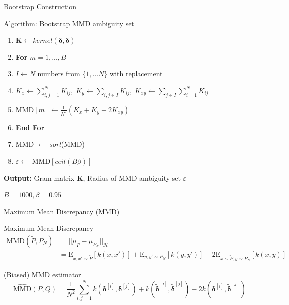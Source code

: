 \documentclass[student, noshadow, itr, english, aspectratio=169]{ITR_LSR_slides}
\begin{document}
\begin{frame}{Bootstrap Construction}
\begin{block}{Algorithm: Bootstrap MMD ambiguity set}
\begin{enumerate}
\item $\boldsymbol{K} \leftarrow \textit{kernel}(\boldsymbol{\delta}, \boldsymbol{\delta})$
\item \textbf{For} $m = 1,...,B$
\item \;\; $I \leftarrow N$ numbers from $\{1, \dots N \}$ with replacement
\item \;\; $K_x \leftarrow \sum_{i,j = 1}^N K_{ij}, \;K_y \leftarrow \sum_{i,j \in I} K_{ij}, \;K_{xy} \leftarrow \sum_{j \in I} \sum_{i = 1}^N K_{ij}$
\item \;\; MMD$[m] \leftarrow \frac{1}{N^2} \left( K_x + K_y - 2 K_{xy} \right) $
\item \textbf{End For} 
\item MMD $ \leftarrow$ \textit{sort}(MMD)
\item $\varepsilon \gets$ MMD$\left[ \textit{ceil} (B \beta) \right]$
\end{enumerate}
\textbf{Output:} Gram matrix $\boldsymbol{K}$, Radius of MMD ambiguity set $\varepsilon$
\end{block}
$B = 1000, \beta = 0.95$
\end{frame}

\begin{frame}{Maximum Mean Discrepancy (MMD)}
\begin{block}{Maximum Mean Discrepancy}
\begin{equation*}
\begin{aligned}
\text{MMD}(\tilde{P}, P_N) &= ||\mu_{\tilde{P}} - \mu_{P_N} ||_{\mathcal{H}}\\
&= \text{E}_{x,x' \sim \tilde{P}}[k(x,x')] + \text{E}_{y,y' \sim P_N}[k(y,y')] - 2\text{E}_{x\sim \tilde{P}, y \sim P_N}[k(x,y)]
\end{aligned}
\end{equation*}
\end{block}

\begin{block}{(Biased) MMD estimator}
\begin{equation*}
\widehat{\text{MMD}} (P, Q) = \frac{1}{N^2} \sum_{i,j = 1}^N k(\boldsymbol{\delta}^{[i]}, \boldsymbol{\delta}^{[j]}) + k(\tilde{\boldsymbol{\delta}}^{[i]}, \tilde{\boldsymbol{\delta}}^{[j]}) - 2 k(\boldsymbol{\delta}^{[i]}, \tilde{\boldsymbol{\delta}}^{[j]})
\end{equation*}
\end{block}

\end{frame}
\end{document}
